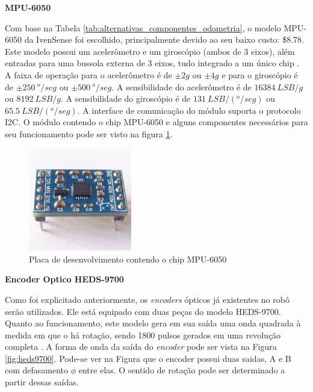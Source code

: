 \textbf{MPU-6050}

Com base na Tabela \ref{tab:alternativas_componentes_odometria}, o modelo MPU-6050 da IvenSense foi escolhido, principalmente devido ao seu baixo custo: \$8.78. Este modelo possui um acelerômetro e um giroscópio (ambos de 3 eixos), além entradas para uma bussola externa de 3 eixos, tudo integrado a um único chip \cite{mpu6050}. A faixa de operação para o acelerômetro é de $ \pm 2g$ ou $\pm 4g $ e para o giroscópio é de $ \pm 250~ ^{o}/seg $ ou $ \pm 500~ ^{o}/seg $. A sensibilidade do acelerômetro é de $ 16384~ LSB/g $ ou $ 8192~ LSB/g $. A sensibilidade do giroscópio é de $ 131~ LSB/ (^{o} / seg) $ ou $ 65.5~ LSB/ (^{o} / seg) $. A interface de comunicação do módulo suporta o protocolo I2C. O módulo contendo o chip MPU-6050 e alguns componentes necessários para seu funcionamento pode ser visto na figura \ref{fig:mpu6050}.

\begin{figure}[H]
\centering
\includegraphics[width=0.4\textwidth]{./figuras/mpu6050.JPG}
\caption{Placa de desenvolvimento contendo o chip MPU-6050}
\label{fig:mpu6050}
\end{figure}

\textbf{Encoder Optico HEDS-9700}

Como foi explicitado anteriormente, os \textit{encoders} ópticos já existentes no robô serão utilizados. Ele está equipado com duas peças do modelo HEDS-9700.
Quanto ao funcionamento, este modelo gera em sua saída uma onda quadrada à medida em que o há rotação, sendo 1800 pulsos gerados em uma revolução completa \cite{heds9700}. A forma de onda da saída do \textit{encoder} pode ser vista na Figura \ref{fig:heds9700}. Pode-se ver na Figura que o encoder possui duas saidas, A e B com defasamento $\phi$ entre elas. O sentido de rotação pode ser determinado a partir dessas saídas.

